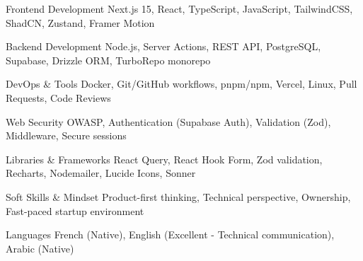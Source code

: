 
\begin{cvskills}

    \cvskill
    {Frontend Development} %
    {Next.js 15, React, TypeScript, JavaScript, TailwindCSS, ShadCN, Zustand, Framer Motion} %

    \cvskill
    {Backend Development} %
    {Node.js, Server Actions, REST API, PostgreSQL, Supabase, Drizzle ORM, TurboRepo monorepo} %

    \cvskill
    {DevOps \& Tools} %
    {Docker, Git/GitHub workflows, pnpm/npm, Vercel, Linux, Pull Requests, Code Reviews} %

    \cvskill
    {Web Security} %
    {OWASP, Authentication (Supabase Auth), Validation (Zod), Middleware, Secure sessions} %

    \cvskill
    {Libraries \& Frameworks} %
    {React Query, React Hook Form, Zod validation, Recharts, Nodemailer, Lucide Icons, Sonner} %

    \cvskill
    {Soft Skills \& Mindset} %
    {Product-first thinking, Technical perspective, Ownership, Fast-paced startup environment} %

    \cvskill
    {Languages} %
    {French (Native), English (Excellent - Technical communication), Arabic (Native)} %

\end{cvskills}